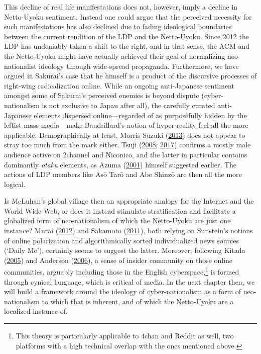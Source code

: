 \documentclass[10pt,british,A4paper,,openany]{memoir}
\begin{document}
This decline of real life manifestations does not, however, imply a
decline in Netto-Uyoku sentiment. Instead one could argue that the
perceived necessity for such manifestations has also declined due to
fading ideological boundaries between the current rendition of the LDP
and the Netto-Uyoku. Since 2012 the LDP has undeniably taken a shift to
the right, and in that sense, the ACM and the Netto-Uyoku might have
actually achieved their goal of normalizing neo-nationalist ideology
through wide-spread propaganda. Furthermore, we have argued in Sakurai's
case that he himself is a product of the discursive processes of
right-wing radicalization online. While an ongoing anti-Japanese
sentiment amongst some of Sakurai's perceived enemies is beyond dispute
(cyber-nationalism is not exclusive to Japan after all), the carefully
curated anti-Japanese elements dispersed online---regarded of as
purposefully hidden by the leftist mass media---make Baudrillard's
notion of hyper-reality feel all the more applicable. Demographically at
least, Morris-Suzuki
(\protect\hyperlink{ref-morris-suzuki_freedom_2013}{2013}) does not
appear to stray too much from the mark either. Tsuji
(\protect\hyperlink{ref-tsuji_eng:_2008}{2008};
\protect\hyperlink{ref-tsuji_eng._2017}{2017}) confirms a mostly male
audience active on 2channel and Niconico, and the latter in particular
contains dominantly \emph{otaku} elements, as Azuma
(\protect\hyperlink{ref-azuma_otaku:_2001}{2001}) himself suggested
earlier. The actions of LDP members like Asō Tarō and Abe Shinzō are
then all the more logical.

Is McLuhan's global village then an appropriate analogy for the Internet
and the World Wide Web, or does it instead stimulate stratification and
facilitate a globalized form of neo-nationalism of which the Netto-Uyoku
are just one instance? Murai
(\protect\hyperlink{ref-murai_net_2012}{2012}) and Sakamoto
(\protect\hyperlink{ref-sakamoto_koreans_2011}{2011}), both relying on
Sunstein's notions of online polarization and algorithmically sorted
individualized news sources (`Daily Me'), certainly seems to suggest the
latter. Moreover, following Kitada
(\protect\hyperlink{ref-kitada_eng:_2005}{2005}) and Anderson
(\protect\hyperlink{ref-anderson_imagined_2006}{2006}), a sense of
insider community on those online communities, arguably including those
in the English cyberspace,\footnote{This theory is particularly
  applicable to 4chan and Reddit as well, two platforms with a high
  technical overlap with the ones mentioned above.} is formed through
cynical language, which is critical of media. In the next chapter then,
we will build a framework around the ideology of cyber-nationalism as a
form of neo-nationalism to which that is inherent, and of which the
Netto-Uyoku are a localized instance of.
\end{document}
